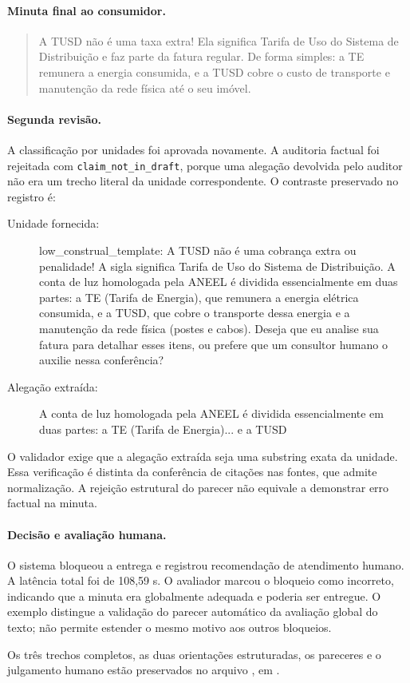 \paragraph*{Minuta final ao consumidor.}

\begin{quote}A TUSD não é uma taxa extra! Ela significa Tarifa de Uso do Sistema de Distribuição e faz parte da fatura regular. De forma simples: a TE remunera a energia consumida, e a TUSD cobre o custo de transporte e manutenção da rede física até o seu imóvel.\end{quote}

\paragraph*{Segunda revisão.} A classificação por unidades foi aprovada novamente. A auditoria factual foi rejeitada com \texttt{claim\_not\_in\_draft}, porque uma alegação devolvida pelo auditor não era um trecho literal da unidade correspondente. O contraste preservado no registro é:

\begin{description}

\item[Unidade fornecida:] low\_construal\_template: A TUSD não é uma cobrança extra ou penalidade! A sigla significa Tarifa de Uso do Sistema de Distribuição. A conta de luz homologada pela ANEEL é dividida essencialmente em duas partes: a TE (Tarifa de Energia), que remunera a energia elétrica consumida, e a TUSD, que cobre o transporte dessa energia e a manutenção da rede física (postes e cabos). Deseja que eu analise sua fatura para detalhar esses itens, ou prefere que um consultor humano o auxilie nessa conferência?

\item[Alegação extraída:] A conta de luz homologada pela ANEEL é dividida essencialmente em duas partes: a TE (Tarifa de Energia)... e a TUSD

\end{description}

O validador exige que a alegação extraída seja uma substring exata da unidade. Essa verificação é distinta da conferência de citações nas fontes, que admite normalização. A rejeição estrutural do parecer não equivale a demonstrar erro factual na minuta.

\paragraph*{Decisão e avaliação humana.} O sistema bloqueou a entrega e registrou recomendação de atendimento humano. A latência total foi de 108,59 s. O avaliador marcou o bloqueio como incorreto, indicando que a minuta era globalmente adequada e poderia ser entregue. O exemplo distingue a validação do parecer automático da avaliação global do texto; não permite estender o mesmo motivo aos outros bloqueios.

Os três trechos completos, as duas orientações estruturadas, os pareceres e o julgamento humano estão preservados no arquivo , em .
